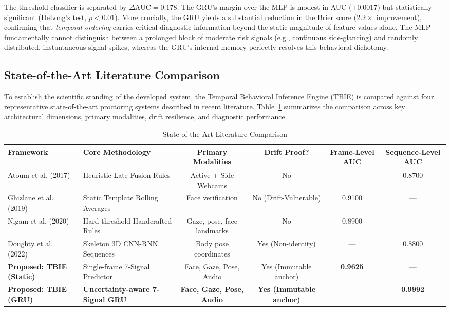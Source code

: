 \documentclass[journal]{IEEEtran}
\begin{document}
The threshold classifier is separated by $\Delta\mathrm{AUC} = 0.178$. The GRU's margin over the MLP is modest in AUC ($+0.0017$) but statistically significant (DeLong's test, $p < 0.01$). More crucially, the GRU yields a substantial reduction in the Brier score ($2.2{\times}$ improvement), confirming that \emph{temporal ordering} carries critical diagnostic information beyond the static magnitude of feature values alone. The MLP fundamentally cannot distinguish between a prolonged block of moderate risk signals (e.g., continuous side-glancing) and randomly distributed, instantaneous signal spikes, whereas the GRU's internal memory perfectly resolves this behavioral dichotomy.

\subsection{State-of-the-Art Literature Comparison}

To establish the scientific standing of the developed system, the Temporal Behavioral Inference Engine (TBIE) is compared against four representative state-of-the-art proctoring systems described in recent literature. Table~\ref{tab:sota} summarizes the comparison across key architectural dimensions, primary modalities, drift resilience, and diagnostic performance.

\begin{table}[!t]
\caption{State-of-the-Art Literature Comparison}
\label{tab:sota}
\centering
\footnotesize
\begin{tabular}{llcccc}
\toprule
\textbf{Framework} & \textbf{Core Methodology} & \textbf{Primary Modalities} & \textbf{Drift Proof?} & \textbf{Frame-Level AUC} & \textbf{Sequence-Level AUC} \\
\midrule
Atoum et al. (2017)~\cite{Atoum2017} & Heuristic Late-Fusion Rules & Active + Side Webcams & No & --- & 0.8700 \\
Ghizlane et al. (2019)~\cite{Ghizlane2019} & Static Template Rolling Averages & Face verification & No (Drift-Vulnerable) & 0.9100 & --- \\
Nigam et al. (2020)~\cite{Nigam2020} & Hard-threshold Handcrafted Rules & Gaze, pose, face landmarks & No & 0.8900 & --- \\
Doughty et al. (2022)~\cite{Doughty2022} & Skeleton 3D CNN-RNN Sequences & Body pose coordinates & Yes (Non-identity) & --- & 0.8800 \\
\midrule
\textbf{Proposed: TBIE (Static)} & Single-frame 7-Signal Predictor & Face, Gaze, Pose, Audio & Yes (Immutable anchor) & \textbf{0.9625} & --- \\
\textbf{Proposed: TBIE (GRU)} & \textbf{Uncertainty-aware 7-Signal GRU} & \textbf{Face, Gaze, Pose, Audio} & \textbf{Yes (Immutable anchor)} & --- & \textbf{0.9992} \\
\bottomrule
\end{tabular}
\end{table}
\end{document}
